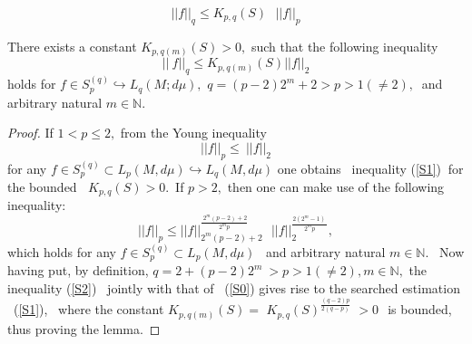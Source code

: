 \documentclass[10pt,a4paper]{amsart}
\begin{document}
	\begin{equation}
		||f||_{q}\leq K_{p,q}(S)\text{ }||f||_{p}  \label{S0}
	\end{equation}%

\begin{lemma}
	\label{Lm_2}There exists a constant $K_{p,q(m)}(S)>0,$ such that the
	following inequality 
	\begin{equation}
		||\ f||_{q}\leq K_{p,q(m)}(S) ||f||_{2}  \label{S1}
	\end{equation}%
	holds for $f\in S_{p}^{(q)}\hookrightarrow L_{q}(M;d\mu ),$ $%
	q=(p-2)2^{m}+2>p>1(\neq 2),\ $ and arbitrary natural $m\in \mathbb{N}.$
\end{lemma}

\begin{proof}
	If $1<p\leq 2,$ from the Young inequality 
	\begin{equation}
		||f||_{p}\leq \ ||f||_{2}  \label{S1a}
	\end{equation}%
	for any $f\in S_{p}^{(q)}\subset L_{p}(M,d\mu )\hookrightarrow L_{q}(M,d\mu
	) $ one obtains \ inequality (\ref{S1}) $\ $for the bounded $\ $ $%
	K_{p,q}(S)>0. $\ If $p>2,$ then  one can make use of the following
	inequality: \ 
	\begin{equation}
		||f||_{p}\leq ||f||_{2^{m}(p-2)+2}^{\frac{\ 2^{m}(p-2)+2}{2^{m}p}}\text{ }%
		||f||_{2}^{\frac{2(2^{m}-1)\ }{2^{m}p}},  \label{S2}
	\end{equation}%
	which holds for any $f\in S_{p}^{(q)}\subset L_{p}(M,d\mu )$ \ and arbitrary
	natural $m\in \mathbb{N}.$ \ Now having put, by definition, $q=2+(p-2)2^{m}\
	>p>1(\neq 2),m\in \mathbb{N},$ the inequality (\ref{S2}) \ jointly with that
	of \ (\ref{S0}) gives rise to the searched estimation \ (\ref{S1}), \ where
	the constant $K_{p,q(m)}(S)=$ $K_{p,q}(S)^{\frac{(q-2)p}{2(q-p)}}$ $>0\ $\
	is bounded, thus proving the lemma.  %
\end{proof}
\end{document}
